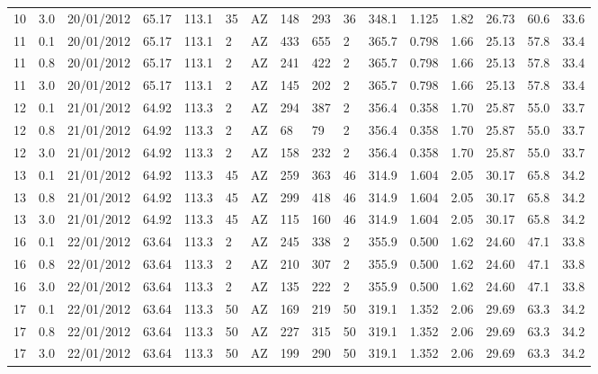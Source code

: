 {\begin{landscape}
\begin{longtable}{llllllllllllllll}
10 & 3.0 & 20/01/2012 & \textminus{}65.17 & 113.1 & 35 & AZ & 148 & 293 & 36 & 348.1 & \textminus{}1.125 & 1.82 & 26.73 & 60.6 & 33.6\\
11 & 0.1 & 20/01/2012 & \textminus{}65.17 & 113.1 & 2 & AZ & 433 & 655 & 2 & 365.7 & \textminus{}0.798 & 1.66 & 25.13 & 57.8 & 33.4\\
11 & 0.8 & 20/01/2012 & \textminus{}65.17 & 113.1 & 2 & AZ & 241 & 422 & 2 & 365.7 & \textminus{}0.798 & 1.66 & 25.13 & 57.8 & 33.4\\
11 & 3.0 & 20/01/2012 & \textminus{}65.17 & 113.1 & 2 & AZ & 145 & 202 & 2 & 365.7 & \textminus{}0.798 & 1.66 & 25.13 & 57.8 & 33.4\\
12 & 0.1 & 21/01/2012 & \textminus{}64.92 & 113.3 & 2 & AZ & 294 & 387 & 2 & 356.4 & \textminus{}0.358 & 1.70 & 25.87 & 55.0 & 33.7\\
12 & 0.8 & 21/01/2012 & \textminus{}64.92 & 113.3 & 2 & AZ & 68 & 79 & 2 & 356.4 & \textminus{}0.358 & 1.70 & 25.87 & 55.0 & 33.7\\
12 & 3.0 & 21/01/2012 & \textminus{}64.92 & 113.3 & 2 & AZ & 158 & 232 & 2 & 356.4 & \textminus{}0.358 & 1.70 & 25.87 & 55.0 & 33.7\\
13 & 0.1 & 21/01/2012 & \textminus{}64.92 & 113.3 & 45 & AZ & 259 & 363 & 46 & 314.9 & \textminus{}1.604 & 2.05 & 30.17 & 65.8 & 34.2\\
13 & 0.8 & 21/01/2012 & \textminus{}64.92 & 113.3 & 45 & AZ & 299 & 418 & 46 & 314.9 & \textminus{}1.604 & 2.05 & 30.17 & 65.8 & 34.2\\
13 & 3.0 & 21/01/2012 & \textminus{}64.92 & 113.3 & 45 & AZ & 115 & 160 & 46 & 314.9 & \textminus{}1.604 & 2.05 & 30.17 & 65.8 & 34.2\\
16 & 0.1 & 22/01/2012 & \textminus{}63.64 & 113.3 & 2 & AZ & 245 & 338 & 2 & 355.9 & 0.500 & 1.62 & 24.60 & 47.1 & 33.8\\
16 & 0.8 & 22/01/2012 & \textminus{}63.64 & 113.3 & 2 & AZ & 210 & 307 & 2 & 355.9 & 0.500 & 1.62 & 24.60 & 47.1 & 33.8\\
16 & 3.0 & 22/01/2012 & \textminus{}63.64 & 113.3 & 2 & AZ & 135 & 222 & 2 & 355.9 & 0.500 & 1.62 & 24.60 & 47.1 & 33.8\\
17 & 0.1 & 22/01/2012 & \textminus{}63.64 & 113.3 & 50 & AZ & 169 & 219 & 50 & 319.1 & \textminus{}1.352 & 2.06 & 29.69 & 63.3 & 34.2\\
17 & 0.8 & 22/01/2012 & \textminus{}63.64 & 113.3 & 50 & AZ & 227 & 315 & 50 & 319.1 & \textminus{}1.352 & 2.06 & 29.69 & 63.3 & 34.2\\
17 & 3.0 & 22/01/2012 & \textminus{}63.64 & 113.3 & 50 & AZ & 199 & 290 & 50 & 319.1 & \textminus{}1.352 & 2.06 & 29.69 & 63.3 & 34.2\\

\end{longtable}
\end{landscape}}
